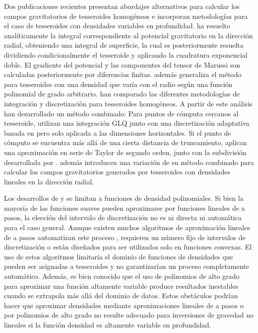 Dos publicaciones recientes presentan abordajes alternativos para calcular los
campos gravitatorios de tesseroides homogéneos e incorporan metodologías para
el caso de tesseroides con densidades variables en profundidad.
\citet{fukushima2018} ha resuelto analíticamente la integral correspondiente al
potencial gravitatorio en la dirección radial, obteniendo una integral de
superficie, la cual es posteriormente resuelta dividiendo condicionalmente el
tesseroide y aplicando la cuadratura exponencial doble.
El gradiente del potencial y las componentes del tensor de Marussi son
calculadas posteriormente por diferencias finitas.
\citet{fukushima2018} además generaliza el método para tesseroides con una
densidad que varía con el radio según una función polinomial de grado
arbitrario.
\citet{lin2019} han comparado las diferentes metodologías de integración
y discretización para tesseroides homogéneos.
A partir de este análisis han desarrollado un método combinado:
Para puntos de cómputo cercanos al tesseroide, utilizan una integración
\ac{GLQ} junto con una discretización adaptativa basada en \citet{uieda2016}
pero solo aplicada a las dimensiones horizontales.
Si el punto de cómputo se encuentra más allá de una cierta distancia de
truncamiento, aplican una aproximación en serie de Taylor de segundo orden,
junto con la subdivisión desarrollada por \citet{grombein2013}.
\citet{lin2019} además introducen una variación de su método combinado para
calcular los campos gravitatorios generados por tesseroides con densidades
lineales en la dirección radial.

Los desarrollos de \citet{lin2019} y \citet{fukushima2018} se limitan
a funciones de densidad polinomiales.
Si bien la mayoría de las funciones suaves pueden aproximarse por funciones
lineales de a pasos, la elección del intervalo de discretización no es ni
directa ni automática para el caso general.
Aunque existen muchos algoritmos de aproximación lineales de a pasos
automatizan este proceso \citep{ketkov1969, vandewalle1975, imamoto2008,
ahmadi2013}, requieren un número fijo de intervalos de discretización o están
diseñados para ser utilizados solo en funciones convexas.
El uso de estos algoritmos limitaría el dominio de funciones de densidades que
pueden ser asignadas a tesseroides y no garantizarían un proceso completamente
automático.
Además, es bien conocido que el uso de polinomios de alto grado para aproximar
una función altamente variable produce resultados inestables cuando se
extrapola más allá del dominio de datos.
Estos obstáculos podrían hacer que aproximar densidades mediante aproximaciones
lineales de a pasos o por polinomios de alto grado no resulte adecuado para
inversiones de gravedad no lineales \citep[e.g.][]{uieda2017} si la función
densidad es altamente variable en profundidad.

